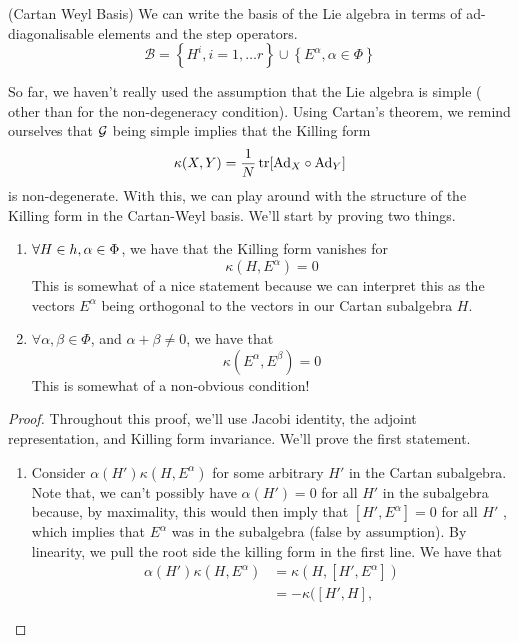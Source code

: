   \begin{defn}{(Cartan Weyl Basis)}
  	We can write the basis of the Lie algebra in terms
	of ad-diagonalisable elements and the step operators. 
	\[
	 \mathcal{ B } = \left\{  H ^ i , i = 1, \dots r   \right\} \cup 
	 \left\{  E ^ \alpha , \alpha \in \Phi  \right\} 
	\]  
  \end{defn}
 So far, we haven't really used the assumption that the Lie algebra is simple ( 
 other than for the non-degeneracy condition). 
Using Cartan's theorem, we remind ourselves 
that $ \mathcal{ G } $ being simple implies that the Killing form 
\[
	\kappa ( X, Y ) = \frac{1}{N } \tr [ \text{Ad} _ X \circ \text{Ad}_ Y ] 
\] is non-degenerate. 
With this, we can play around with the structure 
of the Killing form in the Cartan-Weyl basis. 
We'll start by proving two things.
\begin{thm}
	\begin{enumerate}
		\item $ \forall H \in h , \alpha \in \Phi $, we have 
			that the Killing form vanishes for 
			\[
			 \kappa ( H , E ^ \alpha ) = 0 
			\] This is somewhat 
			of a nice statement because we can interpret this 
			as the vectors $ E ^{ \alpha } $ being 
			orthogonal to the vectors in our Cartan subalgebra $ H$. 
		\item $ \forall \alpha, \beta \in \Phi $, and $ \alpha + \beta \neq 0 $, 
			we have that 
			\[
			 \kappa ( E ^ \alpha, E ^ \beta ) = 0 
			\] This is somewhat of a non-obvious condition! 
	\end{enumerate}
\begin{proof}
Throughout this proof, we'll use 
Jacobi identity, the adjoint representation, and Killing form 
invariance. 
We'll prove the first statement. 
\begin{enumerate}
	\item Consider $ \alpha ( H ' ) \kappa ( H , E ^ \alpha )$ for some 
		arbitrary $ H ' $ in the Cartan subalgebra. Note that, 
		we can't possibly have $ \alpha ( H ' )  =0 $ for 
		all  $ H' $ in the subalgebra because, by maximality, 
		this would then imply that $ [ H' , E ^ \alpha ]  = 0 $ 
		for all $ H'  $ , which implies that $ E ^ \alpha $ was 
		in the subalgebra (false by assumption). 
		By linearity, we pull the root side the killing form 
		in the first line. We have that 
		 \begin{align*}
			 \alpha ( H ' ) \kappa ( H , E ^ \alpha ) &=  
			 \kappa ( H ,  [ H ', E ^ \alpha ] )  \\
								  &=  - \kappa ( [ H ' , H ] ,

\end{align*}
\end{enumerate}
\end{proof}
\end{thm}
